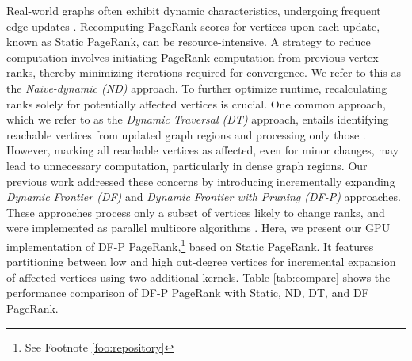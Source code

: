 Real-world graphs often exhibit dynamic characteristics, undergoing frequent edge updates \cite{agarwal2012real, barros2021survey}. Recomputing PageRank scores for vertices upon each update, known as Static PageRank, can be resource-intensive. A strategy to reduce computation involves initiating PageRank computation from previous vertex ranks, thereby minimizing iterations required for convergence. We refer to this as the \textit{Naive-dynamic (ND)} approach. To further optimize runtime, recalculating ranks solely for potentially affected vertices is crucial. One common approach, which we refer to as the \textit{Dynamic Traversal (DT)} approach, entails identifying reachable vertices from updated graph regions and processing only those \cite{rank-desikan05, kim2015incremental, rank-giri20, sahu2022dynamic}. However, marking all reachable vertices as affected, even for minor changes, may lead to unnecessary computation, particularly in dense graph regions. Our previous work \cite{sahu2024df} addressed these concerns by introducing incrementally expanding \textit{Dynamic Frontier (DF)} and \textit{Dynamic Frontier with Pruning (DF-P)} approaches. These approaches process only a subset of vertices likely to change ranks, and were implemented as parallel multicore algorithms \cite{sahu2024df}. Here, we present our GPU implementation of DF-P PageRank,\footnote{See Footnote \ref{foo:repository}} based on Static PageRank. It features partitioning between low and high out-degree vertices for incremental expansion of affected vertices using two additional kernels. Table \ref{tab:compare} shows the performance comparison of DF-P PageRank with Static, ND, DT, and DF PageRank.









